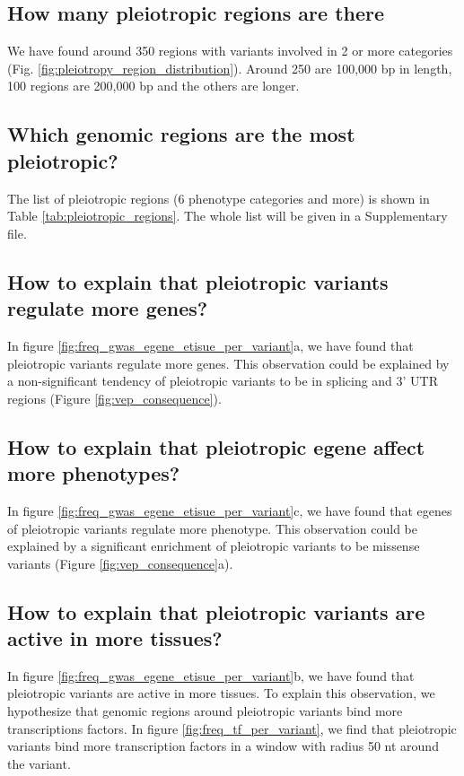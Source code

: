 \subsection*{How many pleiotropic regions are there}

We have found around 350 regions with variants involved in 2 or more categories (Fig. \ref{fig:pleiotropy_region_distribution}).
Around 250 are 100,000 bp in length, 100 regions are 200,000 bp and the others are longer.

\subsection*{Which genomic regions are the most pleiotropic?}

The list of pleiotropic regions (6 phenotype categories and more) is shown in Table \ref{tab:pleiotropic_regions}. The whole list will be given in a Supplementary file.

\subsection*{How to explain that pleiotropic variants regulate more genes?}

In figure \ref{fig:freq_gwas_egene_etisue_per_variant}a, we have found that pleiotropic variants regulate more genes.
This observation could be explained by a non-significant tendency of pleiotropic variants to be in splicing and 3' UTR regions (Figure \ref{fig:vep_consequence}).

\subsection*{How to explain that pleiotropic egene affect more phenotypes?}

In figure \ref{fig:freq_gwas_egene_etisue_per_variant}c, we have found that egenes of pleiotropic variants regulate more phenotype.
This observation could be explained by a significant enrichment of pleiotropic variants to be missense variants (Figure \ref{fig:vep_consequence}a).

\subsection*{How to explain that pleiotropic variants are active in more tissues?}

In figure \ref{fig:freq_gwas_egene_etisue_per_variant}b, we have found that pleiotropic variants are active in more tissues.
To explain this observation, we hypothesize that genomic regions around pleiotropic variants bind more transcriptions factors.
In figure \ref{fig:freq_tf_per_variant}, we find that pleiotropic variants bind more transcription factors in a window with radius 50 nt around the variant.

